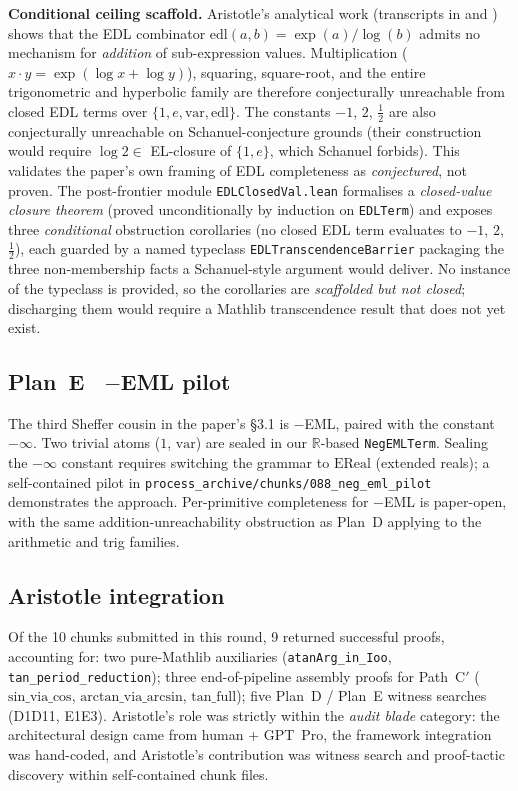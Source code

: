 \documentclass[11pt]{article}
\theoremstyle{plain}
\theoremstyle{definition}
\begin{document}
\noindent\textbf{Conditional ceiling scaffold.} Aristotle's
analytical work (transcripts in
 and ) shows that the
EDL combinator
$\mathrm{edl}(a, b) = \exp(a)/\log(b)$ admits no mechanism for
\emph{addition} of sub-expression values. Multiplication ($x \cdot y =
\exp(\log x + \log y)$), squaring, square-root, and the entire
trigonometric and hyperbolic family are therefore conjecturally
unreachable from closed EDL terms over $\{1, e, \mathrm{var},
\mathrm{edl}\}$. The constants $-1$, $2$, $\frac12$ are also
conjecturally unreachable on Schanuel-conjecture grounds (their
construction would require $\log 2 \in$ EL-closure of $\{1, e\}$, which
Schanuel forbids). This validates the paper's own framing of EDL
completeness as \emph{conjectured}, not proven. The post-frontier
module \texttt{EDLClosedVal.lean} formalises a \emph{closed-value
closure theorem} (proved unconditionally by induction on \texttt{EDLTerm})
and exposes three \emph{conditional} obstruction corollaries
(no closed EDL term evaluates to $-1$, $2$, $\frac12$), each guarded by
a named typeclass \texttt{EDLTranscendenceBarrier} packaging the three
non-membership facts a Schanuel-style argument would deliver. No
instance of the typeclass is provided, so the corollaries are
\emph{scaffolded but not closed}; discharging them would require a
Mathlib transcendence result that does not yet exist.

\subsection*{\texorpdfstring{Plan~E \textemdash\ $-$EML pilot}{Plan E --- -EML pilot}}

The third Sheffer cousin in the paper's \S3.1 is $-$EML, paired with
the constant $-\infty$. Two trivial atoms ($1$, $\mathrm{var}$) are
sealed in our $\mathbb{R}$-based \texttt{NegEMLTerm}. Sealing the
$-\infty$ constant requires switching the grammar to $\mathrm{EReal}$
(extended reals); a self-contained pilot in
\texttt{process\_archive/chunks/088\_neg\_eml\_pilot} demonstrates the approach.
Per-primitive completeness for $-$EML is paper-open, with the same
addition-unreachability obstruction as Plan~D applying to the
arithmetic and trig families.

\subsection*{Aristotle integration}

Of the 10 chunks submitted in this round, 9 returned successful
proofs, accounting for: two pure-Mathlib auxiliaries
(\texttt{atanArg\_in\_Ioo}, \texttt{tan\_period\_reduction}); three
end-of-pipeline assembly proofs for Path~C$'$
($\mathrm{sin\_via\_cos}$, $\mathrm{arctan\_via\_arcsin}$,
$\mathrm{tan\_full}$); five Plan~D / Plan~E witness searches
(D1\textendash D11, E1\textendash E3). Aristotle's role was strictly
within the \emph{audit blade} category: the architectural design
came from human + GPT~Pro, the framework integration was
hand-coded, and Aristotle's contribution was witness search and
proof-tactic discovery within self-contained chunk files.
\end{document}
